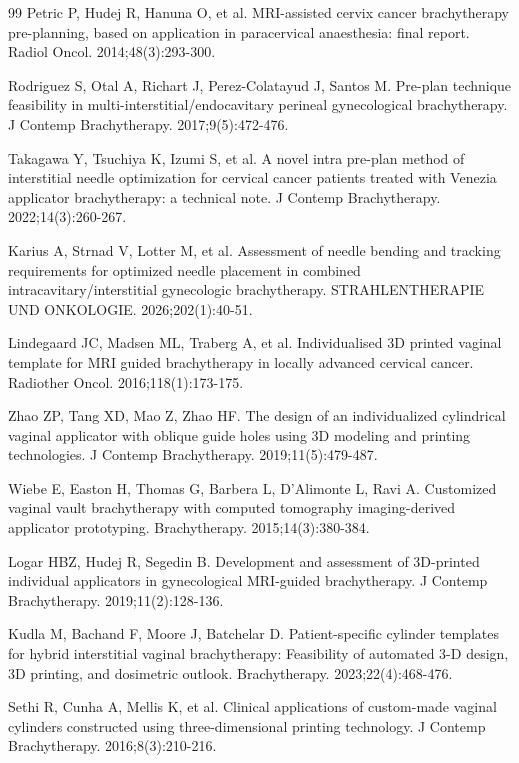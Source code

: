\documentclass[12pt,twoside,letterpaper]{article}
\begin{document}
\begin{thebibliography}{99}
 Petric P, Hudej R, Hanuna O, et al. MRI-assisted cervix cancer brachytherapy pre-planning, based on application in paracervical anaesthesia: final report. Radiol Oncol. 2014;48(3):293-300.

 Rodriguez S, Otal A, Richart J, Perez-Colatayud J, Santos M. Pre-plan technique feasibility in multi-interstitial/endocavitary perineal gynecological brachytherapy. J Contemp Brachytherapy. 2017;9(5):472-476.

 Takagawa Y, Tsuchiya K, Izumi S, et al. A novel intra pre-plan method of interstitial needle optimization for cervical cancer patients treated with Venezia applicator brachytherapy: a technical note. J Contemp Brachytherapy. 2022;14(3):260-267.

 Karius A, Strnad V, Lotter M, et al. Assessment of needle bending and tracking requirements for optimized needle placement in combined intracavitary/interstitial gynecologic brachytherapy. STRAHLENTHERAPIE UND ONKOLOGIE. 2026;202(1):40-51.

 Lindegaard JC, Madsen ML, Traberg A, et al. Individualised 3D printed vaginal template for MRI guided brachytherapy in locally advanced cervical cancer. Radiother Oncol. 2016;118(1):173-175.

 Zhao ZP, Tang XD, Mao Z, Zhao HF. The design of an individualized cylindrical vaginal applicator with oblique guide holes using 3D modeling and printing technologies. J Contemp Brachytherapy. 2019;11(5):479-487.

 Wiebe E, Easton H, Thomas G, Barbera L, D'Alimonte L, Ravi A. Customized vaginal vault brachytherapy with computed tomography imaging-derived applicator prototyping. Brachytherapy. 2015;14(3):380-384.

 Logar HBZ, Hudej R, Segedin B. Development and assessment of 3D-printed individual applicators in gynecological MRI-guided brachytherapy. J Contemp Brachytherapy. 2019;11(2):128-136.

 Kudla M, Bachand F, Moore J, Batchelar D. Patient-specific cylinder templates for hybrid interstitial vaginal brachytherapy: Feasibility of automated 3-D design, 3D printing, and dosimetric outlook. Brachytherapy. 2023;22(4):468-476.

 Sethi R, Cunha A, Mellis K, et al. Clinical applications of custom-made vaginal cylinders constructed using three-dimensional printing technology. J Contemp Brachytherapy. 2016;8(3):210-216.


\end{thebibliography}
\end{document}
